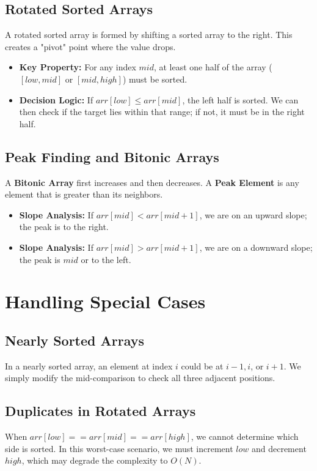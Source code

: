 \documentclass[11pt,a4paper,oneside]{book}
\begin{document}
\subsection{Rotated Sorted Arrays}
A rotated sorted array is formed by shifting a sorted array to the right. This creates a "pivot" point where the value drops.
\begin{itemize}
    \item \textbf{Key Property:} For any index $mid$, at least one half of the array ($[low, mid]$ or $[mid, high]$) must be sorted.
    \item \textbf{Decision Logic:} If $arr[low] \leq arr[mid]$, the left half is sorted. We can then check if the target lies within that range; if not, it must be in the right half.
\end{itemize}



\subsection{Peak Finding and Bitonic Arrays}
A \textbf{Bitonic Array} first increases and then decreases. A \textbf{Peak Element} is any element that is greater than its neighbors.
\begin{itemize}
    \item \textbf{Slope Analysis:} If $arr[mid] < arr[mid+1]$, we are on an upward slope; the peak is to the right.
    \item \textbf{Slope Analysis:} If $arr[mid] > arr[mid+1]$, we are on a downward slope; the peak is $mid$ or to the left.
\end{itemize}



\section{Handling Special Cases}

\subsection{Nearly Sorted Arrays}
In a nearly sorted array, an element at index $i$ could be at $i-1, i$, or $i+1$. We simply modify the mid-comparison to check all three adjacent positions.

\subsection{Duplicates in Rotated Arrays}
When $arr[low] == arr[mid] == arr[high]$, we cannot determine which side is sorted. In this worst-case scenario, we must increment $low$ and decrement $high$, which may degrade the complexity to $O(N)$.
\end{document}
